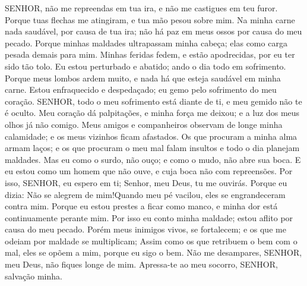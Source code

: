 {\PP 
  SENHOR, não me repreendas em tua ira, e não me castigues em teu furor.
  Porque tuas flechas me atingiram, e tua mão pesou sobre mim.
  Na minha carne nada
{} saudável, por causa de tua ira; não há paz em meus ossos por causa do meu pecado.
  Porque minhas maldades ultrapassam minha cabeça; elas
{} como carga pesada demais para mim.
  Minhas feridas fedem, e estão apodrecidas, por eu ter sido tão tolo.
  Eu estou perturbado e abatido; ando o dia todo em sofrimento.
  Porque meus lombos ardem muito, e nada há que esteja saudável em minha carne.
  Estou enfraquecido e despedaçado; eu gemo pelo sofrimento do meu coração.
  SENHOR, todo o meu sofrimento está diante de ti, e meu gemido não te é oculto.
  Meu coração dá palpitações, e minha força me deixou; e a luz dos meus olhos já não
{} comigo.
  Meus amigos e companheiros observam de longe minha calamidade; e os meus vizinhos ficam afastados.
  Os que procuram
{} a minha alma
{} armam laços; e os que procuram o meu mal falam insultos e todo o dia planejam maldades.
  Mas eu
{} como o surdo, não ouço; e como o mudo,
{} não abre sua boca.
  E eu estou como um homem que não ouve, e cuja boca não
{} com repreensões.
  Por isso, SENHOR, eu espero em ti; Senhor, meu Deus, tu me ouvirás.
  Porque eu dizia: Não se alegrem de mim!Quando meu pé vacilou, eles se engrandeceram contra mim.
  Porque eu estou prestes a ficar como manco, e minha dor está continuamente perante mim.
  Por isso eu
{} conto minha maldade; estou aflito por causa do meu pecado.
  Porém meus inimigos
{} vivos,
{} se fortalecem; e os que me odeiam por maldade se multiplicam;
  Assim como os que retribuem o bem com o mal, eles se opõem a mim, porque eu sigo o bem.
  Não me desampares, SENHOR, meu Deus, não fiques longe de mim.
  Apressa-te ao meu socorro, SENHOR, salvação minha.
\par }


